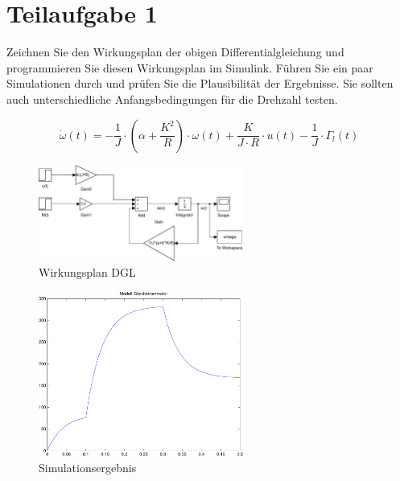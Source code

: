 \section{Teilaufgabe 1}
\begin{aufgabe}
    Zeichnen Sie den Wirkungsplan der obigen Differentialgleichung und 
    programmieren Sie diesen Wirkungsplan im Simulink. Führen Sie ein paar 
    Simulationen durch und prüfen Sie die Plausibilität der Ergebnisse. Sie 
    sollten auch unterschiedliche Anfangsbedingungen für die Drehzahl testen.
\end{aufgabe}
\[ \dot{\omega}(t) 
    = -\frac{1}{J} \cdot \left(\alpha + \frac{K^2}{R}\right) \cdot \omega(t) 
    + \frac{K}{J \cdot R} \cdot u(t) - \frac{1}{J} \cdot \Gamma_l(t) \]
\begin{figure}[h!]
    \centering
    \includegraphics[width=0.6\textwidth]{01/wirkungsplan.pdf}
    \caption{Wirkungsplan DGL}
    \label{fig:01}
\end{figure}
\begin{figure}[h!]
    \centering
    \includegraphics[width=0.6\textwidth]{01/wirkungsplan_plot.pdf}
    \caption{Simulationsergebnis}
    \label{fig:01plot}
\end{figure}
